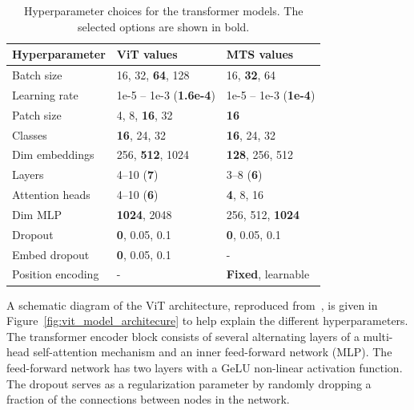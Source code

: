 \begin{table}[htb]
    \centering
    \caption{Hyperparameter choices for the transformer models. The selected options are shown in bold.}
    \label{tab:transformer_hyperparams}
    \begin{tabular}{lll}
    \toprule
    \textbf{Hyperparameter} & \textbf{ViT values} & \textbf{MTS values} \\ 
    \midrule
    Batch size           & 16, 32, \textbf{64}, 128 & 16, \textbf{32}, 64 \\
    Learning rate        & 1e-5 -- 1e-3 (\textbf{1.6e-4}) & 1e-5 -- 1e-3 (\textbf{1e-4}) \\
    Patch size           & 4, 8, \textbf{16}, 32 & \textbf{16} \\
    Classes              & \textbf{16}, 24, 32 & \textbf{16}, 24, 32 \\
    Dim embeddings       & 256, \textbf{512}, 1024 & \textbf{128}, 256, 512 \\
    Layers               & 4--10 (\textbf{7}) & 3--8 (\textbf{6}) \\
    Attention heads      & 4--10 (\textbf{6}) & \textbf{4}, 8, 16 \\
    Dim MLP              & \textbf{1024}, 2048 & 256, 512, \textbf{1024} \\
    Dropout              & \textbf{0}, 0.05, 0.1 & \textbf{0}, 0.05, 0.1 \\
    Embed dropout        & \textbf{0}, 0.05, 0.1 & - \\
    Position encoding    & - & \textbf{Fixed}, learnable \\
    \bottomrule
    \end{tabular}
\end{table}

A schematic diagram of the ViT architecture, reproduced from~\cite{Vaswani_2017_transformer}, is given in Figure~\ref{fig:vit_model_architecure} to help explain the different hyperparameters. The transformer encoder block consists of several alternating layers of a multi-head self-attention mechanism and an inner feed-forward network (MLP). The feed-forward network has two layers with a GeLU non-linear activation function. The dropout serves as a regularization parameter by randomly dropping a fraction of the connections between nodes in the network.

